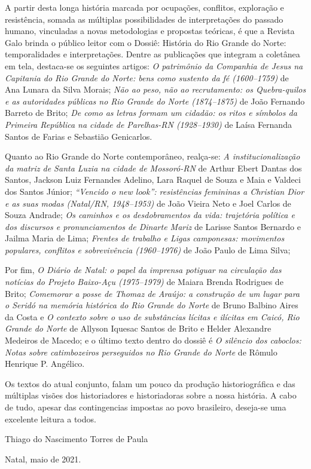 A partir desta longa história marcada por ocupações, conflitos, exploração e resistência, somada as múltiplas possibilidades de interpretações do passado humano, vinculadas a novas metodologias e propostas teóricas, é que a Revista Galo brinda o público leitor com o Dossiê: História do Rio Grande do Norte: temporalidades e interpretações. Dentre as publicações que integram a coletânea em tela, destaca-se os seguintes artigos: \textit{O patrimônio da Companhia de Jesus na Capitania do Rio Grande do Norte: bens como sustento da fé (1600--1759)} de Ana Lunara da Silva Morais; \textit{Não ao peso, não ao recrutamento: os Quebra-quilos e as autoridades públicas no Rio Grande do Norte (1874--1875)} de João Fernando Barreto de Brito; \textit{De como as letras formam um cidadão: os ritos e símbolos da Primeira República na cidade de Parelhas-RN (1928--1930)} de Laísa Fernanda Santos de Farias e Sebastião Genicarlos.

Quanto ao Rio Grande do Norte contemporâneo, realça-se: \textit{A institucionalização da matriz de Santa Luzia na cidade de Mossoró-RN} de Arthur Ebert Dantas dos Santos, Jackson Luiz Fernandes Adelino, Lara Raquel de Souza e Maia e Valdeci dos Santos Júnior; \textit{“Vencido o \emph{new look}”: resistências femininas a Christian Dior e as suas modas (Natal/RN, 1948--1953)} de João Vieira Neto e Joel Carlos de Souza Andrade; \textit{Os caminhos e os desdobramentos da vida: trajetória política e dos discursos e pronunciamentos de Dinarte Mariz} de Larisse Santos Bernardo e Jailma Maria de Lima; \textit{Frentes de trabalho e Ligas camponesas: movimentos populares, conflitos e sobrevivência (1960--1976)} de João Paulo de Lima Silva;  

Por fim, \textit{O Diário de Natal: o papel da imprensa potiguar na circulação das notícias do Projeto Baixo-Açu (1975--1979)} de Maiara Brenda Rodrigues de Brito; \textit{Comemorar a posse de Thomaz de Araújo: a construção de um lugar para o \emph{Seridó} na memória histórica do Rio Grande do Norte} de Bruno Balbino Aires da Costa e \textit{O contexto sobre o uso de substâncias lícitas e ilícitas em Caicó, Rio Grande do Norte} de Allyson Iquesac Santos de Brito e Helder Alexandre Medeiros de Macedo; e o último texto dentro do dossiê é \textit{O silêncio dos caboclos: Notas sobre catimbozeiros perseguidos no Rio Grande do Norte} de Rômulo Henrique P. Angélico. 

Os textos do atual conjunto, falam um pouco da produção historiográfica e das múltiplas visões dos historiadores e historiadoras sobre a nossa história. A cabo de tudo, apesar das contingencias impostas ao povo brasileiro, deseja-se uma excelente leitura a todos. 

\bigskip

Thiago do Nascimento Torres de Paula

\bigskip

\hfill Natal, maio de 2021.